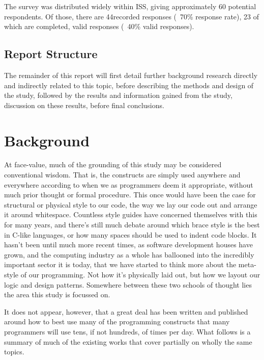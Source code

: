 \documentclass{article}
\begin{document}
            The survey was distributed widely within ISS, giving approximately 60 potential respondents. Of those, there are 44recorded responses  (~70\% response rate), 23 of which are completed, valid responses (~40\% valid responses).
    \subsection{Report Structure}
        The remainder of this report will first detail further background research directly and indirectly related to this topic, before describing the methods and design of the study, followed by the results and information gained from the study, discussion on these results, before final conclusions.
\newpage
\section{Background}
\label{sec:background}
    At face-value, much of the grounding of this study may be considered conventional wisdom. That is, the constructs are simply used anywhere and everywhere according to when we as programmers deem it appropriate, without much prior thought or formal procedure. This once would have been the case for structural or physical style to our code, the way we lay our code out and arrange it around whitespace. Countless style guides have concerned themselves with this for many years, and there's still much debate around which brace style is the best in C-like languages, or how many spaces should be used to indent code blocks. It hasn't been until much more recent times, as software development houses have grown, and the computing industry as a whole has ballooned into the incredibly important sector it is today, that we have started to think more about the meta-style of our programming. Not how it's physically laid out, but how we layout our logic and design patterns. Somewhere between these two schools of thought lies the area this study is focussed on.

    It does not appear, however, that a great deal has been written and published around how to best use many of the programming constructs that many programmers will use tens, if not hundreds, of times per day. What follows is a summary of much of the existing works that cover partially on wholly the same topics.
\end{document}
